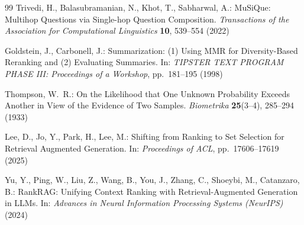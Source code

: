 \documentclass[runningheads]{llncs}
\begin{document}
\begin{thebibliography}{99}
Trivedi, H., Balasubramanian, N., Khot, T., Sabharwal, A.:
MuSiQue: Multihop Questions via Single-hop Question Composition.
\emph{Transactions of the Association for Computational Linguistics} \textbf{10}, 539--554 (2022)

Goldstein, J., Carbonell, J.:
Summarization: (1) Using MMR for Diversity-Based Reranking and (2) Evaluating Summaries.
In: \emph{TIPSTER TEXT PROGRAM PHASE III: Proceedings of a Workshop}, pp.~181--195 (1998)

Thompson, W.~R.:
On the Likelihood that One Unknown Probability Exceeds Another in View of the Evidence of Two Samples.
\emph{Biometrika} \textbf{25}(3--4), 285--294 (1933)

Lee, D., Jo, Y., Park, H., Lee, M.:
Shifting from Ranking to Set Selection for Retrieval Augmented Generation.
In: \emph{Proceedings of ACL}, pp.~17606--17619 (2025)

Yu, Y., Ping, W., Liu, Z., Wang, B., You, J., Zhang, C., Shoeybi, M., Catanzaro, B.:
RankRAG: Unifying Context Ranking with Retrieval-Augmented Generation in LLMs.
In: \emph{Advances in Neural Information Processing Systems (NeurIPS)} (2024)







\end{thebibliography}
\end{document}
